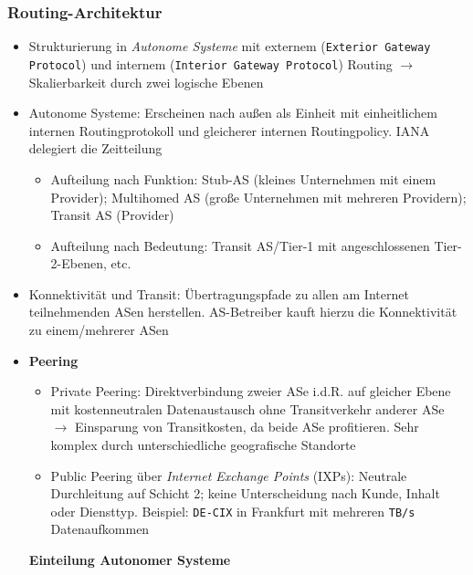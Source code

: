 \subsubsection{Routing-Architektur}
\begin{itemize}
	\item Strukturierung in \textit{Autonome Systeme} mit externem (\texttt{Exterior Gateway Protocol}) und internem (\texttt{Interior Gateway Protocol}) Routing \(\rightarrow\) Skalierbarkeit durch zwei logische Ebenen
	\item Autonome Systeme: Erscheinen nach außen als Einheit mit einheitlichem internen Routingprotokoll und gleicherer internen Routingpolicy. IANA delegiert die Zeitteilung
	\begin{itemize}
		\item Aufteilung nach Funktion: Stub-AS (kleines Unternehmen mit einem Provider); Multihomed AS (große Unternehmen mit mehreren Providern); Transit AS (Provider)
		\item Aufteilung nach Bedeutung: Transit AS/Tier-1 mit angeschlossenen Tier-2-Ebenen, etc.
	\end{itemize}
	\item Konnektivität und Transit: Übertragungspfade zu allen am Internet teilnehmenden ASen herstellen. AS-Betreiber kauft hierzu die Konnektivität zu einem/mehrerer ASen
	\item \textbf{Peering}
	\begin{itemize}
		\item Private Peering: Direktverbindung zweier ASe i.d.R. auf gleicher Ebene mit kostenneutralen Datenaustausch ohne Transitverkehr anderer ASe \(\rightarrow\) Einsparung von Transitkosten, da beide ASe profitieren. Sehr komplex durch unterschiedliche geografische Standorte
		\item Public Peering über \textit{Internet Exchange Points} (IXPs): Neutrale Durchleitung auf Schicht 2; keine Unterscheidung nach Kunde, Inhalt oder Diensttyp. Beispiel: \texttt{DE-CIX} in Frankfurt mit mehreren \texttt{TB/s} Datenaufkommen
	\end{itemize}
	\textbf{Einteilung Autonomer Systeme}
\end{itemize}
